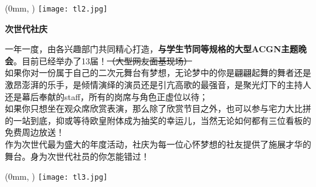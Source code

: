\begin{textblock*}{\paperwidth}(0mm, \dimexpr\paperheight-78.5mm\relax) %
  \noindent\texttt{[image: tl2.jpg]}
\end{textblock*}
\newpage
\fontsize{26pt}{28pt}\selectfont
\begin{center}
    \textbf{\textcolor{truepurple}{次世代社庆}}\\
\end{center}
\normalsize
\chind 一年一度，由各兴趣部门共同精心打造，\textbf{与学生节同等规格的大型ACGN主题晚会}。目前已经举办了13届！\sout{（大型网友面基现场）}\\
\chind 如果你对一份属于自己的二次元舞台有梦想，无论梦中的你是翩翩起舞的舞者还是激昂澎湃的乐手，是倾情演绎的演员还是引亢高歌的最强音，是聚光灯下的主持人还是幕后奉献的staff，所有的岗席与角色正虚位以待；\\
\chind 如果你只想坐在观众席欣赏表演，那么除了欣赏节目之外，也可以参与宅力大比拼的一站到底，抑或等待欧皇附体成为抽奖的幸运儿，当然无论如何都有三位看板的免费周边放送！\\
\chind 作为次世代最为盛大的年度活动，社庆为每一位心怀梦想的社友提供了施展才华的舞台。身为次世代社员的你怎能错过！\\
\vspace{1em}
\par
{}
\hfill
\vspace{1em}
\begin{textblock*}{\paperwidth}(0mm, \dimexpr\paperheight-78.5mm\relax) %
  \noindent\texttt{[image: tl3.jpg]}
\end{textblock*}



